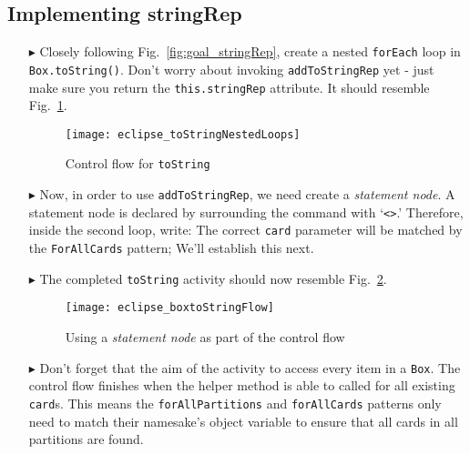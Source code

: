\newpage
\hypertarget{stringRep tex}{}
\subsection{Implementing stringRep}
\texHeader

\vspace{0.5cm}

\begin{itemize}
  
\item[$\blacktriangleright$] Closely following Fig.~\ref{fig:goal_stringRep}, create a nested \texttt{forEach} loop in \texttt{Box.toString()}.
Don't worry about invoking \texttt{addToStringRep} yet -  just make sure you return the \texttt{this.stringRep} attribute. It should resemble
Fig.~\ref{fig:emptyLoops}.

\begin{figure}[htp]
\begin{center}
  \texttt{[image: eclipse\_toStringNestedLoops]}
  \caption{Control flow for \texttt{toString}}
  \label{fig:emptyLoops}
\end{center}
\end{figure}

\item[$\blacktriangleright$] Now, in order to use \texttt{addToStringRep}, we need create a \emph{statement node}. A statement node is declared by surrounding
the command with  `\texttt{<>}.' Therefore, inside the second loop, write:
The correct \texttt{card} parameter will be matched by the \texttt{ForAllCards} pattern; We'll establish this next.

\vspace{0.5cm}

\item[$\blacktriangleright$] The completed \texttt{toString} activity should now resemble Fig.~\ref{fig:toStringFlow}.

\vspace{0.5cm}

\begin{figure}[htp]
\begin{center}
  \texttt{[image: eclipse\_boxtoStringFlow]}
  \caption{Using a \emph{statement node} as part of the control flow}
  \label{fig:toStringFlow}
\end{center}
\end{figure}

\item[$\blacktriangleright$] Don't forget that the aim of the activity to access every item in a \texttt{Box}. The control flow finishes when the helper method
is able to called for all existing \texttt{card}s. This means the \texttt{forAllPartitions} and \texttt{forAllCards} patterns only need to match their
namesake's object variable to ensure that all cards in all partitions are found.


\end{itemize}
